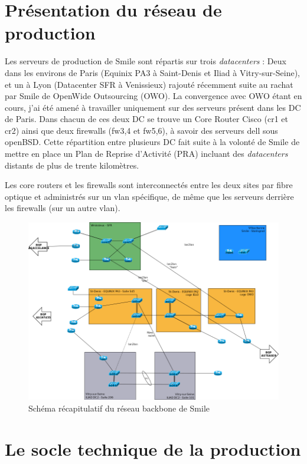\documentclass[14 pt]{extreport}
\begin{document}
\section{Présentation du réseau de production}

Les serveurs de production de Smile sont répartis sur trois \emph{datacenters} : Deux dans les environs de Paris (Equinix PA3 à Saint-Denis et Iliad à Vitry-sur-Seine), et un à Lyon (Datacenter SFR à Venissieux) rajouté récemment suite au rachat par Smile de OpenWide Outsourcing (OWO). La convergence avec OWO étant en cours, j'ai été amené à travailler uniquement sur des serveurs présent dans les DC de Paris. Dans chacun de ces deux DC se trouve un Core Router Cisco (cr1 et cr2) ainsi que deux firewalls (fw3,4 et fw5,6), à savoir des serveurs dell sous openBSD. Cette répartition entre plusieurs DC fait suite à la volonté de Smile de mettre en place un Plan de Reprise d'Activité (PRA) incluant des \emph{datacenters} distants de plus de trente kilomètres.

Les core routers et les firewalls sont interconnectés entre les deux sites par fibre optique et administrés sur un vlan spécifique, de même que les serveurs derrière les firewalls (sur un autre vlan).

\begin{figure}[htp]
\centering
\includegraphics[scale=0.4]{reseau_backbone.png}
\caption{Schéma récapitulatif du réseau backbone de Smile}
\label{}
\end{figure}
\section{Le socle technique de la production}
\end{document}
